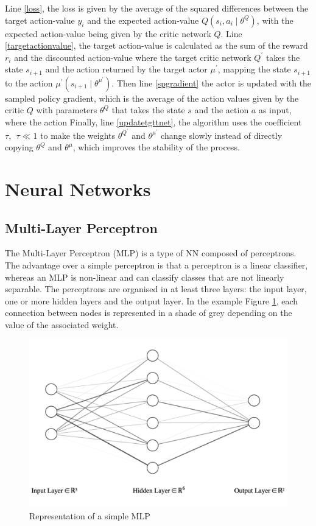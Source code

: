 Line \ref{loss}, the loss is given by the average of the squared differences between the target action-value $y_i$ and the expected action-value $Q\left(s_i,a_i \mid \theta^{Q}\right)$, with the expected action-value being given by the critic network $Q$. Line \ref{targetactionvalue}, the target action-value is calculated as the sum of the reward $r_i$ and the discounted action-value where the target critic network $Q^{'}$ takes the state $s_{i+1}$ and the action returned by the target actor $\mu^{'}$, mapping the state $s_{i+1}$ to the action $\mu^{'}\left(s_{i+1} \mid \theta^{\mu^{'}}\right)$. \newline
Then line \ref{spgradient} the actor is updated with the sampled policy gradient, which is the average of the action values given by the critic $Q$ with parameters $\theta^{Q}$ that takes the state $s$ and the action $a$ as input, where the action 
\newline
Finally, line \ref{updatetgttnet}, the algorithm uses the coefficient $\tau, \: \: \tau \ll 1$ to make the weights $\theta^{Q^{'}}$ and $\theta^{\mu^{'}}$ change slowly instead of directly copying $\theta^{Q}$ and $\theta^{\mu}$, which improves the stability of the process.


\section{Neural Networks}
\label{nns}
\subsection{Multi-Layer Perceptron}
\label{mlpsection}

The Multi-Layer Perceptron (MLP) is a type of NN composed of perceptrons. The advantage over a simple perceptron is that a perceptron is a linear classifier, whereas an MLP is non-linear and can classify classes that are not linearly separable. The perceptrons are organised in at least three layers: the input layer, one or more hidden layers and the output layer. In the example Figure \ref{mlp}, each connection between nodes is represented in a shade of grey depending on the value of the associated weight.

\begin{figure}[H]
\centering
\includegraphics[scale=0.3]{Figures/mlp.png}
\caption{Representation of a simple MLP}
\label{mlp}
\end{figure}

